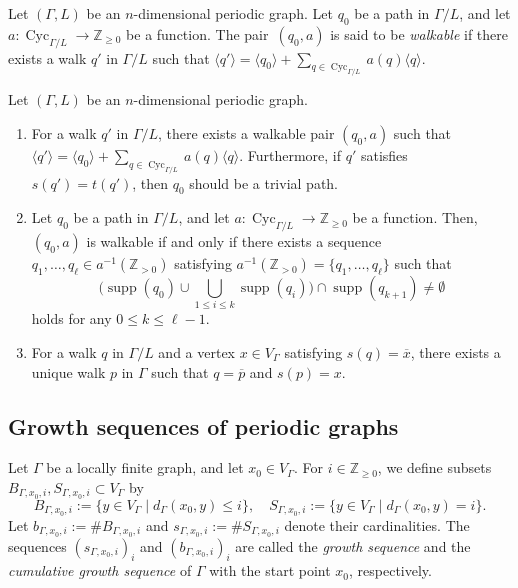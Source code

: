\begin{defn}[{cf.\ \cite[Definition 2.11]{IN}}]
Let $(\Gamma, L)$ be an $n$-dimensional periodic graph. 
Let $q_0$ be a path in $\Gamma /L$, and let $a : \operatorname{Cyc}_{\Gamma /L} \to \mathbb{Z}_{\ge 0}$ be a function. 
The pair~$(q_0, a)$ is said to be \textit{walkable} if there exists a walk $q'$ in $\Gamma / L$ such that 
$\langle q' \rangle = \langle q_0 \rangle + \sum _{q \in \operatorname{Cyc}_{\Gamma /L}} a(q) \langle q \rangle$. 
\end{defn}

\begin{lem}\label{lem:bunkai}
Let $(\Gamma, L)$ be an $n$-dimensional periodic graph. 
\begin{enumerate}
\item 
For a walk $q'$ in $\Gamma / L$, there exists a walkable pair $(q_0, a)$ such that 
$\langle q' \rangle = \langle q_0 \rangle + \sum _{q \in \operatorname{Cyc}_{\Gamma /L}} a(q) \langle q \rangle$. 
Furthermore, if $q'$ satisfies $s(q') = t(q')$, then $q_0$ should be a trivial path. 

\item 
Let $q_0$ be a path in $\Gamma /L$, and let $a : \operatorname{Cyc}_{\Gamma /L} \to \mathbb{Z}_{\ge 0}$ be a function. 
Then, $(q_0, a)$ is walkable if and only if 
there exists a sequence $q_1, \ldots , q_{\ell} \in a^{-1}(\mathbb{Z}_{>0})$ satisfying
$a^{-1}(\mathbb{Z}_{>0}) = \{ q_1, \ldots , q_{\ell} \}$ such that 
\[
\biggl( \operatorname{supp}(q_0) \cup \bigcup _{1 \le i \le k} \operatorname{supp}(q_i) \biggr) 
\cap \operatorname{supp}(q_{k+1}) \not = \emptyset
\] 
holds for any $0 \le k \le \ell -1$.

\item
For a walk $q$ in $\Gamma / L$ and a vertex $x \in V_{\Gamma}$ satisfying $s(q) = \overline{x}$, there exists a unique walk $p$ in $\Gamma$ such that $q = \overline{p}$ and $s(p) = x$. 
\end{enumerate}
\end{lem}


\subsection{Growth sequences of periodic graphs}\label{subsection:CS}
Let $\Gamma$ be a locally finite graph, and let $x_0 \in V_{\Gamma}$. 
For $i \in \mathbb{Z}_{\ge 0}$, we define subsets $B_{\Gamma, x_0, i}, S_{\Gamma, x_0,i} \subset V _{\Gamma}$ by
\[
B_{\Gamma, x_0,i} := \{ y \in V _{\Gamma} \mid d_{\Gamma}(x_0, y) \le i \}, \quad
S_{\Gamma, x_0,i} := \{ y \in V _{\Gamma} \mid d_{\Gamma}(x_0, y) = i \}. 
\]
Let $b_{\Gamma, x_0,i} := \# B_{\Gamma, x_0,i}$ and $s_{\Gamma, x_0,i} := \# S_{\Gamma, x_0,i}$ denote their cardinalities. 
The sequences $(s_{\Gamma, x_0,i})_i$ and $(b_{\Gamma, x_0,i})_i$ are called the \textit{growth sequence} and the \textit{cumulative growth sequence} of $\Gamma$ with the start point $x_0$, respectively. 

